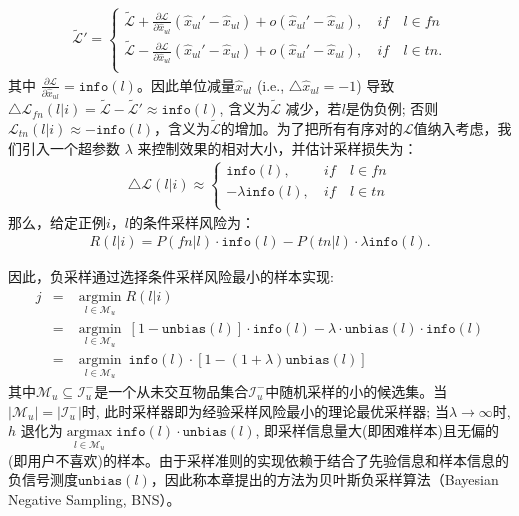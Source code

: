 \begin{eqnarray}
	\tilde{	\mathcal{L}}' =\left\{
	\begin{aligned}
		\tilde{\mathcal{L}} +  \frac{\partial \mathcal{L}} {\partial \hat{x}_{ul}}  ( \hat{x}_{ul}' - \hat{x}_{ul}) + o( \hat{x}_{ul}' - \hat{x}_{ul}) ,~ &if&~ l \in fn\\
		\tilde{\mathcal{L}} -  \frac{\partial \mathcal{L}} {\partial \hat{x}_{ul}}  ( \hat{x}_{ul}' - \hat{x}_{ul}) + o( \hat{x}_{ul}' - \hat{x}_{ul}) ,~ &if&~ l \in tn.\\
	\end{aligned}
	\right.
\end{eqnarray}
其中 $ \frac{\partial \mathcal{L}} {\partial \hat{x}_{ul}} =  \mathtt{info}(l) $。因此单位减量$\hat{x}_{ul}$ (i.e., $\triangle \hat{x}_{ul}=-1$) 导致 $\triangle \mathcal{L}_{fn}(l|i) = \tilde{\mathcal{L}}-\tilde{\mathcal{L}}' \approx \mathtt{info}(l)$, 含义为$\tilde{\mathcal{L}}$ 减少，若$l$是伪负例; 否则$\mathcal{L}_{tn}(l|i)  \approx -\mathtt{info}(l) $，含义为$\tilde{\mathcal{L}}$的增加。为了把所有有序对的$\mathcal{L}$值纳入考虑，我们引入一个超参数 $\lambda$ 来控制效果的相对大小，并估计采样损失为：
\begin{eqnarray} \label{Eq:rankinggain}
	\triangle	\mathcal{L}(l|i)  \approx \left\{
	\begin{aligned}
		\mathtt{info}(l) ,~ &if&~ l \in fn\\
		- \lambda \mathtt{info}(l) ,~ &if&~ l \in tn\\
	\end{aligned}
	\right.
\end{eqnarray}
那么，给定正例$i$，$l$的条件采样风险为：
\begin{eqnarray}
	R(l|i) = P(fn|l) \cdot \mathtt{info}(l) - P(tn|l)\cdot \lambda\mathtt{info}(l).
\end{eqnarray}

因此，负采样通过选择条件采样风险最小的样本实现:
\begin{eqnarray} \label{Eq:NegativeSam}
	j   &=&   \mathop{\arg\min}\limits_{l \in \mathcal{M}_u} R(l|i) \nonumber \\
	&=& \mathop{\arg\min}\limits_{l \in \mathcal{M}_u}~ [1-\mathtt{unbias}(l)] \cdot \mathtt{info}(l)- \lambda \cdot \mathtt{unbias}(l) \cdot \mathtt{info}(l)  \nonumber \\
	&=& \mathop{\arg\min}\limits_{l \in\mathcal{M}_u}~ \mathtt{info}(l)\cdot [1-(1+\lambda)\mathtt{unbias}(l)]
\end{eqnarray}
其中$\mathcal{M}_u \subseteq  \mathcal{I}_u^-$是一个从未交互物品集合$\mathcal{I}_u^-$中随机采样的小的候选集。当 $|\mathcal{M}_u| = |\mathcal{I}_u^-|$时, 此时采样器即为经验采样风险最小的理论最优采样器; 当$\lambda \rightarrow \infty$时, $h$ 退化为$\mathop{\arg\max}\limits_{l \in\mathcal{M}_u} \mathtt{info}(l)\cdot \mathtt{unbias}(l)$, 即采样信息量大(即困难样本)且无偏的(即用户不喜欢)的样本。由于采样准则的实现依赖于结合了先验信息和样本信息的负信号测度$\mathtt{unbias}(l)$，因此称本章提出的方法为贝叶斯负采样算法（Bayesian Negative Sampling, BNS）。

